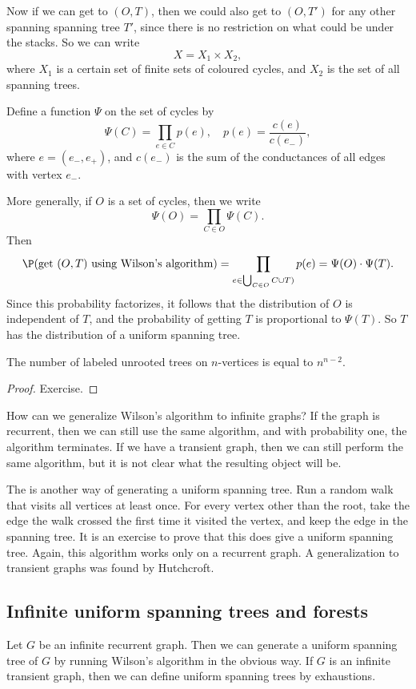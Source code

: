 \documentclass[a4paper]{article}
\begin{document}
Now if we can get to $(O, T)$, then we could also get to $(O, T')$ for any other spanning spanning tree $T'$, since there is no restriction on what could be under the stacks. So we can write
\[
  X = X_1 \times X_2,
\]
where $X_1$ is a certain set of finite sets of coloured cycles, and $X_2$ is the set of all spanning trees.

Define a function $\Psi$ on the set of cycles by
\[
  \Psi(C) = \prod_{e \in C} p(e),\quad p(e) = \frac{c(e)}{c(e_-)},
\]
where $e = (e_-, e_+)$, and $c(e_-)$ is the sum of the conductances of all edges with vertex $e_-$.

More generally, if $O$ is a set of cycles, then we write
\[
  \Psi(O) = \prod_{C \in O} \Psi(C).
\]
Then
\[
  \P(\text{get $(O, T)$ using Wilson's algorithm}) = \prod_{e \in \bigcup_{C \in O} C \cup T)} p(e) = \Psi(O) \cdot \Psi(T).
\]
Since this probability factorizes, it follows that the distribution of $O$ is independent of $T$, and the probability of getting $T$ is proportional to $\Psi(T)$. So $T$ has the distribution of a uniform spanning tree.

\begin{cor}
  The number of labeled unrooted trees on $n$-vertices is equal to $n^{n - 2}$.
\end{cor}

\begin{proof}
  Exercise.
\end{proof}

How can we generalize Wilson's algorithm to infinite graphs? If the graph is recurrent, then we can still use the same algorithm, and with probability one, the algorithm terminates. If we have a transient graph, then we can still perform the same algorithm, but it is not clear what the resulting object will be.

The  is another way of generating a uniform spanning tree. Run a random walk that visits all vertices at least once. For every vertex other than the root, take the edge the walk crossed the first time it visited the vertex, and keep the edge in the spanning tree. It is an exercise to prove that this does give a uniform spanning tree. Again, this algorithm works only on a recurrent graph. A generalization to transient graphs was found by Hutchcroft.

\subsection{Infinite uniform spanning trees and forests}
Let $G$ be an infinite recurrent graph. Then we can generate a uniform spanning tree of $G$ by running Wilson's algorithm in the obvious way. If $G$ is an infinite transient graph, then we can define uniform spanning trees by exhaustions.
\end{document}
